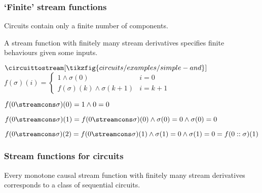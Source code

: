 \begin{frame}
    \frametitle{`Finite' stream functions}

    Circuits contain only a finite number of components.

    A stream function with \alert{finitely many stream derivatives} specifies finite behaviours given some inputs.

    \vspace{1em}

    \begin{center}
        \(
            \circuittostream[\tikzfig{circuits/examples/simple-and}]{}
        \)
        \qquad
        \(
            f(\sigma)(i) =
            \begin{cases}
                1 \land \sigma(0) & i = 0 \\
                f(\sigma)(k) \land \sigma(k+1) & i = k+1
                
            \end{cases}
        \)
        \pause

        \vspace{1.5em}

        \(
            f(0 \streamcons \sigma)(0) = 1 \land 0 = 0
        \)
        \pause

        \(
            f(0 \streamcons \sigma)(1) = f(0 \streamcons \sigma)(0) \land \sigma(0) = 0 \land \sigma(0) = 0
        \)\pause
        
        \(
            f(0 \streamcons \sigma)(2) = f(0 \streamcons \sigma)(1) \land \sigma(1) = 0 \land \sigma(1) = 0 = f(0 :: \sigma)(1)
        \)
    \end{center}

\end{frame}

\begin{frame}
    \frametitle{Stream functions for circuits}
    \begin{theorem}
        Every monotone causal stream function with finitely many stream derivatives corresponds to a class of sequential circuits. 
    \end{theorem}
\end{frame}